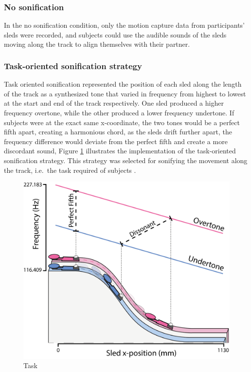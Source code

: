 \documentclass[10pt,a4paper,onecolumn]{article}
\begin{document}
\hypertarget{no-sonification}{%
\subsubsection{No sonification}\label{no-sonification}}

In the no sonification condition, only the motion capture data from participants' sleds were recorded, and subjects could use the audible sounds of the sleds moving along the track to align themselves with their partner.

\hypertarget{task-oriented-sonification-strategy}{%
\subsubsection{Task-oriented sonification strategy}\label{task-oriented-sonification-strategy}}

Task oriented sonification represented the position of each sled along the length of the track as a synthesized tone that varied in frequency from highest to lowest at the start and end of the track respectively. One sled produced a higher frequency overtone, while the other produced a lower frequency undertone. If subjects were at the exact same x-coordinate, the two tones would be a perfect fifth apart, creating a harmonious chord, as the sleds drift further apart, the frequency difference would deviate from the perfect fifth and create a more discordant sound, Figure \ref{fig:task-illustration} illustrates the implementation of the task-oriented sonification strategy. This strategy was selected for sonifying the movement along the track, i.e.~the task required of subjects .

\begin{figure}[h]

{\centering \includegraphics[width=1\linewidth]{figures/task_sonif_illustration} 

}

\caption{Task}\label{fig:task-illustration}
\end{figure}
\end{document}
